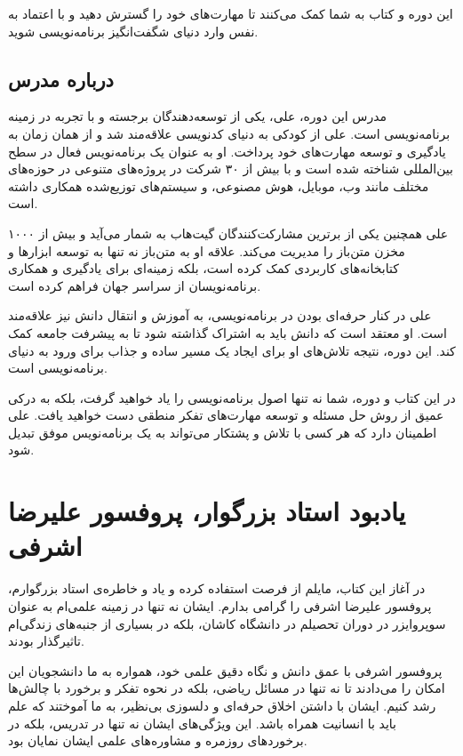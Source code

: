 \documentclass[b5paper,12pt]{article}
\begin{document}
	این دوره و کتاب به شما کمک می‌کنند تا مهارت‌های خود را گسترش دهید و با اعتماد به نفس وارد دنیای شگفت‌انگیز برنامه‌نویسی شوید.
	
	
	\newpage
	\subsection*{درباره مدرس}
	
	مدرس این دوره، علی، یکی از توسعه‌دهندگان برجسته و با تجربه در زمینه برنامه‌نویسی است. علی از کودکی به دنیای کدنویسی علاقه‌مند شد و از همان زمان به یادگیری و توسعه مهارت‌های خود پرداخت. او به عنوان یک برنامه‌نویس فعال در سطح بین‌المللی شناخته شده است و با بیش از ۳۰ شرکت در پروژه‌های متنوعی در حوزه‌های مختلف مانند وب، موبایل، هوش مصنوعی، و سیستم‌های توزیع‌شده همکاری داشته است.
	
	علی همچنین یکی از برترین مشارکت‌کنندگان گیت‌هاب به شمار می‌آید و بیش از ۱۰۰۰ مخزن متن‌باز را مدیریت می‌کند. علاقه او به متن‌باز نه تنها به توسعه ابزارها و کتابخانه‌های کاربردی کمک کرده است، بلکه زمینه‌ای برای یادگیری و همکاری برنامه‌نویسان از سراسر جهان فراهم کرده است.
	
	علی در کنار حرفه‌ای بودن در برنامه‌نویسی، به آموزش و انتقال دانش نیز علاقه‌مند است. او معتقد است که دانش باید به اشتراک گذاشته شود تا به پیشرفت جامعه کمک کند. این دوره، نتیجه تلاش‌های او برای ایجاد یک مسیر ساده و جذاب برای ورود به دنیای برنامه‌نویسی است. 
	
	در این کتاب و دوره، شما نه تنها اصول برنامه‌نویسی را یاد خواهید گرفت، بلکه به درکی عمیق از روش حل مسئله و توسعه مهارت‌های تفکر منطقی دست خواهید یافت. علی اطمینان دارد که هر کسی با تلاش و پشتکار می‌تواند به یک برنامه‌نویس موفق تبدیل شود.
	
	
	\newpage
	
	\section*{یادبود استاد بزرگوار، پروفسور علیرضا اشرفی}
	
	در آغاز این کتاب، مایلم از فرصت استفاده کرده و یاد و خاطره‌ی استاد بزرگوارم، پروفسور علیرضا اشرفی را گرامی بدارم. ایشان نه تنها در زمینه علمی‌ام به عنوان سوپروایزر در دوران تحصیلم در دانشگاه کاشان، بلکه در بسیاری از جنبه‌های زندگی‌ام تاثیرگذار بودند.
	
	پروفسور اشرفی با عمق دانش و نگاه دقیق علمی‌ خود، همواره به ما دانشجویان این امکان را می‌دادند تا نه تنها در مسائل ریاضی، بلکه در نحوه تفکر و برخورد با چالش‌ها رشد کنیم. ایشان با داشتن اخلاق حرفه‌ای و دلسوزی بی‌نظیر، به ما آموختند که علم باید با انسانیت همراه باشد. این ویژگی‌های ایشان نه تنها در تدریس، بلکه در برخوردهای روزمره‌ و مشاوره‌های علمی‌ ایشان نمایان بود.
	
\end{document}
